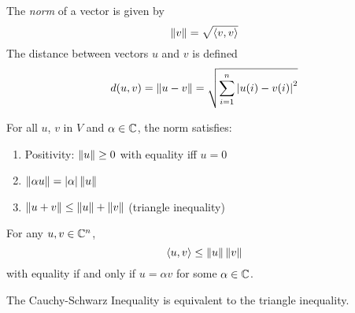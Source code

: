 \begin{definition}
    The \emph{norm} of a vector is given by
    \[\left\lVert v\right\rVert = \sqrt{\left\langle v, v\right\rangle}\]
    The distance between vectors $u$ and $v$ is defined
    \[d(u, v) = \left\lVert u - v\right\rVert = \sqrt{\sum_{i=1}^n\left\lvert u(i) - v(i)\right\rvert^2}\]
\end{definition}

\begin{theorem}
    For all $u$, $v$ in $V$ and $\alpha \in \mathbb{C}$, the norm satisfies:
    \begin{enumerate}[label=\arabic*.]
        \item Positivity: $\left\lVert u\right\rVert \geq 0$ with equality iff $u = 0$
        \item $\left\lVert\alpha u\right\rVert = \left\lvert\alpha\right\rvert\left\lVert u\right\rVert$
        \item $\left\lVert u + v\right\rVert \leq \left\lVert u\right\rVert + \left\lVert v\right\rVert$ (triangle inequality)
    \end{enumerate}
\end{theorem}

\begin{theorem}
    For any $u, v \in \mathbb{C}^n$,
    \[\left\langle u, v\right\rangle \leq \left\lVert u\right\rVert\left\lVert v\right\rVert\]
    with equality if and only if $u = \alpha v$ for some $\alpha \in \mathbb{C}$.
\end{theorem}

The Cauchy-Schwarz Inequality is equivalent to the triangle inequality.